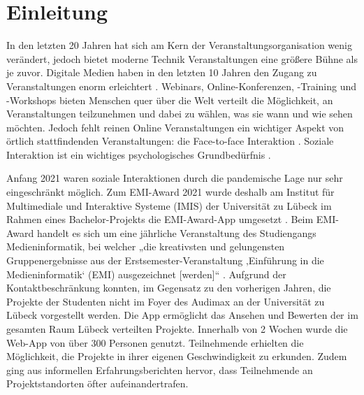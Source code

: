 \chapter{Einleitung}


In den letzten 20 Jahren hat sich am Kern der Veranstaltungsorganisation wenig
verändert, jedoch bietet moderne Technik Veranstaltungen eine größere Bühne als
je zuvor. Digitale Medien haben in den letzten 10 Jahren den Zugang zu
Veranstaltungen enorm erleichtert \cite{Bladen2012}. Webinars,
Online-Konferenzen, -Training und -Workshops bieten Menschen quer über die Welt
verteilt die Möglichkeit, an Veranstaltungen teilzunehmen und dabei zu wählen,
was sie wann und wie sehen möchten. Jedoch fehlt reinen Online Veranstaltungen
ein wichtiger Aspekt von örtlich stattfindenden Veranstaltungen: die
Face-to-face Interaktion \cite{Bladen2012}. Soziale Interaktion ist ein wichtiges
psychologisches Grundbedürfnis \cite{Maslow1943}.

Anfang 2021 waren soziale Interaktionen durch die pandemische Lage nur sehr
eingeschränkt möglich. Zum EMI-Award 2021 wurde deshalb am Institut für
Multimediale und Interaktive Systeme (IMIS) der Universität zu Lübeck im Rahmen
eines Bachelor-Projekts die EMI-Award-App umgesetzt \cite{Canzler2021}. Beim
EMI-Award handelt es sich um eine jährliche Veranstaltung des Studiengangs
Medieninformatik, bei welcher „die kreativsten und gelungensten
Gruppenergebnisse aus der Erstsemester-Veranstaltung ‚Einführung in die
Medieninformatik‘ (EMI) ausgezeichnet [werden]“ \cite{UniversitatzuLubeck2021}.
Aufgrund der Kontaktbeschränkung konnten, im Gegensatz zu den vorherigen Jahren,
die Projekte der Studenten nicht im Foyer des Audimax an der Universität zu
Lübeck vorgestellt werden. Die App ermöglicht das Ansehen und Bewerten der im
gesamten Raum Lübeck verteilten Projekte. Innerhalb von 2 Wochen wurde die
Web-App von über 300 Personen genutzt. Teilnehmende erhielten die Möglichkeit,
die Projekte in ihrer eigenen Geschwindigkeit zu erkunden. Zudem ging aus
informellen Erfahrungsberichten hervor, dass Teilnehmende an Projektstandorten
öfter aufeinandertrafen.


